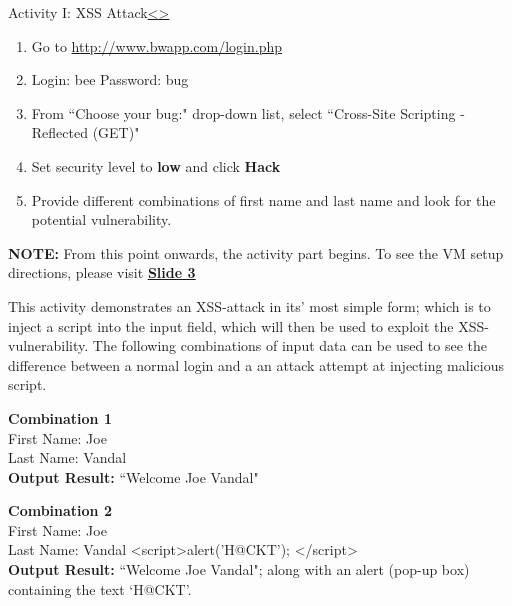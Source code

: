 \documentclass[12pt]{extarticle}
\newenvironment{instructionblock}{\Large\bgroup}{\egroup}
\begin{document}


\pagebreak
\begin{slide}{Activity I: XSS Attack}{\hyperref[slide 11]{\textless}\hyperref[slide 13]{\textgreater}}
	\begin{instructionblock}
		\begin{enumerate}
			\item Go to \url{http://www.bwapp.com/login.php}
			\item Login: bee      Password: bug
			\item From ``Choose your bug:" drop-down list, select ``Cross-Site Scripting - Reflected (GET)"
			\item Set security level to \textbf{low} and click \textbf{Hack}
			\item Provide different combinations of first name and last name and look for the potential vulnerability.
		\end{enumerate}
	\end{instructionblock}	
\end{slide}

\vspace{4mm}
\noindent 
\textbf{NOTE:} From this point onwards, the activity part begins. To see the VM setup directions, please visit \hyperref[slide 3]{\textbf{\underline{Slide 3}}}

\vspace{4mm}
\noindent
This activity demonstrates an XSS-attack in its' most simple form; which is to inject a script into the input field, which will then be used to exploit the XSS-vulnerability. The following combinations of input data can be used to see the difference between a normal login and a an attack attempt at injecting malicious script.

\vspace{4mm}
\noindent 
\textbf{Combination 1}\\
First Name: Joe\\
Last Name: Vandal\\
\textbf{Output Result:} ``Welcome Joe Vandal" 

\vspace{5mm}
\noindent 
\textbf{Combination 2}\\
First Name: Joe\\
Last Name: Vandal \textless script\textgreater alert('H@CKT'); \textless/script\textgreater\\
\textbf{Output Result:} ``Welcome Joe Vandal"; along with an alert (pop-up box) containing the text `H@CKT'. 
\end{document}
